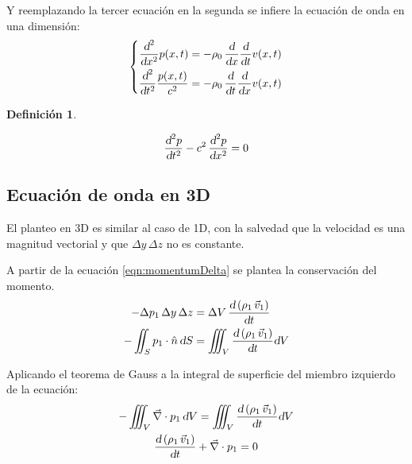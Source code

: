 \documentclass[a5paper,12pt,twoside]{book}
\newtheorem{defn}{{Definición}}[chapter]
\begin{document}
Y reemplazando la tercer ecuación en la segunda se infiere la ecuación de onda en una dimensión:
\begin{equation*}
    \left\{
    \begin{aligned}
        \frac{\textsl{d}^2}{\textsl{d} x^2} p(x,t) &= - \rho_0 \, \frac{\textsl{d}}{\textsl{d} x} \frac{\textsl{d}}{\textsl{d} t} v(x,t)
        \\
        \frac{\textsl{d}^2}{\textsl{d} t^2} \frac{p(x,t)}{c^2} &= - \rho_0 \, \frac{\textsl{d}}{\textsl{d} t} \frac{\textsl{d}}{\textsl{d} x} v(x,t)
    \end{aligned}
    \right.
\end{equation*}

\begin{mdframed}[style=DefinitionFrame]
    \begin{defn}
        \label{defn:soundWave1D}
    \end{defn}
    \begin{equation*}
        \frac{\textsl{d}^2 p}{\textsl{d} t^2} - c^2 \, \frac{\textsl{d}^2 p}{\textsl{d} x^2} = 0
    \end{equation*}
\end{mdframed}


\subsection{Ecuación de onda en 3D}

El planteo en 3D es similar al caso de 1D, con la salvedad que la velocidad es una magnitud vectorial y que $\Delta y \, \Delta z$ no es constante.

A partir de la ecuación \ref{eqn:momentumDelta} se plantea la conservación del momento.
\begin{align*}
    - \Delta p_1 \, \Delta y \, \Delta z
    &=
    \Delta V \, \frac{\textsl{d} \left( \rho_1 \, \Vec{v}_1 \right)}{\textsl{d} t}
    \\
    - \iint_S p_1 \cdot \hat{n} \, \textsl{d} S
    &= \iiint_V \frac{\textsl{d} \left( \rho_1 \, \Vec{v}_1 \right)}{\textsl{d} t} \textsl{d} V
\end{align*}

Aplicando el teorema de Gauss a la integral de superficie del miembro izquierdo de la ecuación:
\begin{gather}
    - \iiint_V \Vec{\nabla} \cdot p_1 \, \textsl{d} V
    =
    \iiint_V \frac{\textsl{d} \left( \rho_1 \, \Vec{v}_1 \right)}{\textsl{d} t} \textsl{d} V
    \notag\\
    \frac{\textsl{d} \left( \rho_1 \, \Vec{v}_1 \right)}{\textsl{d} t} + \Vec{\nabla} \cdot p_1 = 0
    \label{eqn:momentum3D}
\end{gather}
\end{document}
